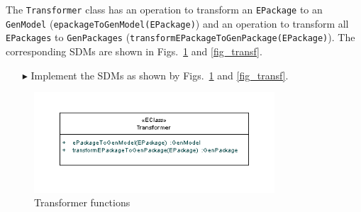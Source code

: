 The \texttt{Transformer} class has an operation to transform an \texttt{EPackage} to an \texttt{GenModel} (\texttt{epackageToGenModel(EPackage)}) and an operation to transform all \texttt{EPackages} to \texttt{GenPackages} (\texttt{transformEPackageToGenPackage(EPackage)}). The corresponding SDMs are shown in Figs.~\ref{fig_e2gm} and \ref{fig_transf}.

\begin{enumerate}
\item[$\blacktriangleright$] Implement the SDMs as shown by Figs.~\ref{fig_e2gm} and \ref{fig_transf}.
\end{enumerate}

% 
% 

\begin{figure}[htbp]
\begin{center}  
\includegraphics[width=0.8\textwidth]{pics/Ecore2GenModel_Bilder/EA_ecore2gM.png}
\caption{Transformer functions}  
\label{fig_e2gm}
\end{center}
\end{figure} 

